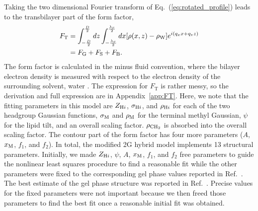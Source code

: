 Taking the two dimensional Fourier transform of Eq.~(\ref{eq:rotated_profile})
leads to the transbilayer part of the form factor,
\begin{align}
  F_\mathrm{T} 
  &= \int_{-\frac{D}{2}}^{\frac{D}{2}}\mathop{dz}
     \int_{-\frac{\lambda_r}{2}}^{\frac{\lambda_r}{2}}\mathop{dx} 
     \mathopen{}\left[ \rho(x,z)-\rho_\mathrm{W} \right]\mathclose{} e^{i(q_xx+q_zz)} \\
  &= F_\mathrm{G} + F_\mathrm{S} + F_\mathrm{B}.
\end{align}
The form factor is calculated in the minus fluid convention, 
where the bilayer electron density
is measured with respect to the electron density of the surrounding solvent,
water \cite{ref:Worthington73}.
The expression for $F_\mathrm{T}$ is rather messy, so 
the derivation and full expression are in Appendix~\ref{app:FT}. Here, 
we note that
the fitting parameters in this model are $Z_{\mathrm{H}i}$, $\sigma_{\mathrm{H}i}$, and 
$\rho_{\mathrm{H}i}$ for each of the two headgroup Gaussian functions, $\sigma_\mathrm{M}$ and
$\rho_\mathrm{M}$ for
the terminal methyl Gaussian, $\psi$ for
the lipid tilt, and an overall scaling factor. $\rho_\mathrm{CH_2}$ is absorbed into 
the overall scaling factor. The contour part of the 
form factor has four more parameters ($A$, $x_\textrm{M}$, $f_1$, and $f_2$).
In total, the modified 2G hybrid model implements 13 structural parameters.
Initially, we made $Z_{\mathrm{H}i}$, $\psi$, $A$, $x_\textrm{M}$, $f_1$, and $f_2$ free 
parameters
to guide the nonlinear least squares procedure to find a reasonable fit
while the other parameters were fixed to the corresponding gel phase values 
reported in Ref.~\cite{ref:Wiener89}. 
The best estimate of the gel phase structure was reported in
Ref.~\cite{Tristram-Nagle02}. Precise values for the fixed parameters
were not important because we then freed those parameters to find the best fit
once a reasonable initial fit was obtained.  

